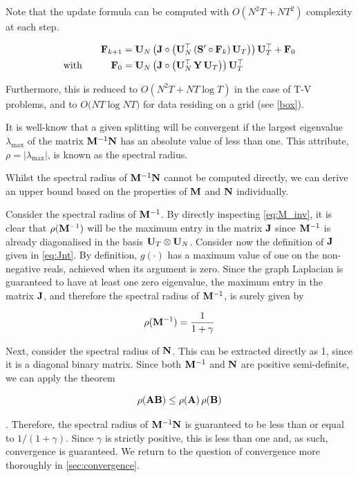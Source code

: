 Note that the update formula can be computed with $O(N^2T + NT^2)$ complexity at each step.  


\begin{align}
    \label{eq:update3}
    \mathbf{F}_{k+1} & = \mathbf{U}_N \, \big( \mathbf{J}  \circ \big( \mathbf{U}_N^\top \, (\mathbf{S}' \circ \mathbf{F}_{k})\, \mathbf{U}_T \big) \big) \, \mathbf{U}_T^\top + \mathbf{F}_0 \\
    \label{eq:update4}
    \text{with} \quad\quad\quad \mathbf{F}_0 & = \mathbf{U}_N \, \big( \mathbf{J}  \circ \big( \mathbf{U}_N^\top \, \mathbf{Y} \, \mathbf{U}_T \big) \big) \, \mathbf{U}_T^\top 
\end{align}


Furthermore, this is reduced to $O(N^2T + NT \log T)$ in the case of T-V problems, and to $O\big(NT \log NT \big)$ for data residing on a grid (see \cref{box}). 


It is well-know that a given splitting will be convergent if the largest eigenvalue $\lambda_{\text{max}}$ of the matrix $\mathbf{M}^{-1}\mathbf{N}$ has an absolute value of less than one. This attribute, $\rho = |\lambda_{\text{max}}|$, is known as the spectral radius. 

Whilst the spectral radius of $\mathbf{M}^{-1}\mathbf{N}$ cannot be computed directly, we can derive an upper bound based on the properties of $\mathbf{M}$ and $\mathbf{N}$ individually. 

Consider the spectral radius of $\mathbf{M}^{-1}$. By directly inspecting \cref{eq:M_inv}, it is clear that $\rho(\mathbf{M}^{-1})$ will be the maximum entry in the matrix $\mathbf{J}$ since $\mathbf{M}^{-1}$ is already diagonalised in the basis $\mathbf{U}_T \otimes \mathbf{U}_N$. Consider now the definition of $\mathbf{J}$ given in \cref{eq:Jnt}. By definition, $g(\cdot)$ has a maximum value of one on the non-negative reals, achieved when its argument is zero. Since the graph Laplacian is guaranteed to have at least one zero eigenvalue, the maximum entry in the matrix $\mathbf{J}$, and therefore the spectral radius of $\mathbf{M}^{-1}$, is surely given by

\begin{equation}
    \rho(\mathbf{M}^{-1}) = \frac{1}{1 + \gamma}
\end{equation}

Next, consider the spectral radius of $\mathbf{N}$. This can be extracted directly as 1, since it is a diagonal binary matrix. Since both $\mathbf{M}^{-1}$ and $\mathbf{N}$ are positive semi-definite, we can apply the theorem

\begin{equation}
    \label{eq:psd}
    \rho(\mathbf{A}\mathbf{B}) \leq \rho(\mathbf{A}) \, \rho(\mathbf{B})
\end{equation}

\citep{Bhatia1997}. Therefore, the spectral radius of $\mathbf{M}^{-1}\mathbf{N}$ is guaranteed to be less than or equal to $1 / (1 + \gamma)$.  Since $\gamma$ is strictly positive, this is less than one and, as such, convergence is guaranteed. We return to the question of convergence more thoroughly in \cref{sec:convergence}. 

